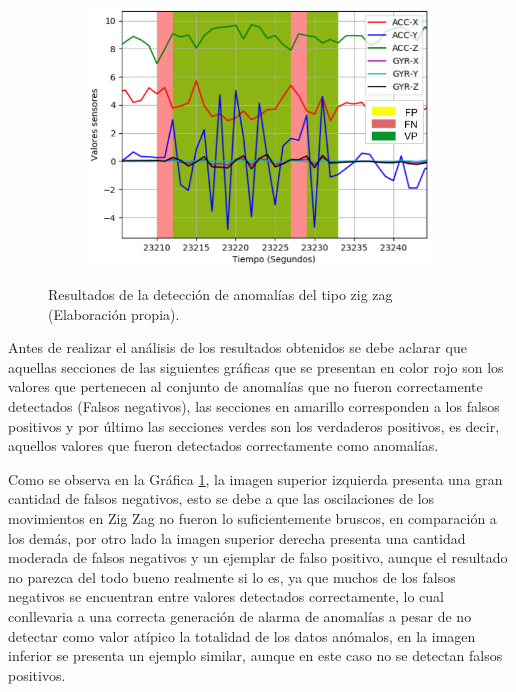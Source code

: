 \begin{figure}[H]
{\begin{varwidth}{\textwidth}
\begin{subfigure}[h]{0.45\textwidth}
        \end{subfigure}
        \begin{subfigure}[h]{0.45\textwidth} 
            \includegraphics[width=\textwidth]{imagenes/Cap5/zig_zag3}
        \end{subfigure} 
        \end{varwidth}}
        \caption{Resultados de la detecci\'{o}n de anomal\'{i}as del tipo zig zag (Elaboraci\'{o}n propia).}
		\label{fig:resultados_zigzag}
    \end{figure}
    
Antes de realizar el an\'{a}lisis de los resultados obtenidos se debe aclarar que aquellas secciones de las siguientes gr\'{a}ficas que se presentan en color rojo son los valores que pertenecen al conjunto de anomal\'{i}as que no fueron correctamente detectados (Falsos negativos), las secciones en amarillo corresponden a los falsos positivos y por \'{u}ltimo las secciones verdes son los verdaderos positivos, es decir, aquellos valores que fueron detectados correctamente como anomal\'{i}as.

\vspace{5mm} %

Como se observa en la Gr\'{a}fica \ref{fig:resultados_zigzag}, la imagen superior izquierda presenta una gran cantidad de falsos negativos, esto se debe a que las oscilaciones de los movimientos en Zig Zag no fueron lo suficientemente bruscos, en comparaci\'{o}n a los dem\'{a}s, por otro lado la imagen superior derecha presenta una cantidad moderada de falsos negativos y un ejemplar de falso positivo, aunque el resultado no parezca del todo bueno realmente si lo es, ya que muchos de los falsos negativos se encuentran entre valores detectados correctamente, lo cual conllevaria a una correcta generaci\'{o}n de alarma de anomal\'{i}as a pesar de no detectar como valor at\'{i}pico la totalidad de los datos an\'{o}malos, en la imagen inferior se presenta un ejemplo similar, aunque en este caso no se detectan falsos positivos.

